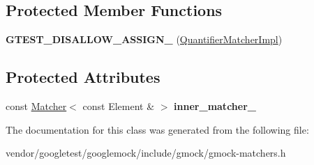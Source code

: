 \subsection*{Protected Member Functions}
\begin{DoxyCompactItemize}
\item 
\mbox{\label{classtesting_1_1internal_1_1_quantifier_matcher_impl_ad57fcd1799e59217fe40c0144ff024f1}} 
{\bfseries G\+T\+E\+S\+T\+\_\+\+D\+I\+S\+A\+L\+L\+O\+W\+\_\+\+A\+S\+S\+I\+G\+N\+\_\+} (\mbox{\hyperlink{classtesting_1_1internal_1_1_quantifier_matcher_impl}{Quantifier\+Matcher\+Impl}})
\end{DoxyCompactItemize}
\subsection*{Protected Attributes}
\begin{DoxyCompactItemize}
\item 
\mbox{\label{classtesting_1_1internal_1_1_quantifier_matcher_impl_af0ee2a4697f5cb8e937fd29dd75e2a30}} 
const \mbox{\hyperlink{classtesting_1_1_matcher}{Matcher}}$<$ const Element \& $>$ {\bfseries inner\+\_\+matcher\+\_\+}
\end{DoxyCompactItemize}


The documentation for this class was generated from the following file\+:\begin{DoxyCompactItemize}
\item 
vendor/googletest/googlemock/include/gmock/gmock-\/matchers.\+h\end{DoxyCompactItemize}
